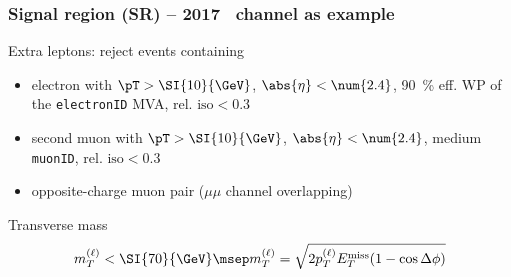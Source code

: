 \begin{frame}
\frametitle{Signal region (SR) -- 2017 \mu\tauh\ channel as example}

\begin{block}{Extra leptons: reject events containing}
\begin{itemize}
\item electron with $\pT > \SI{10}{\GeV}$, $\abs{\eta} < \num{2.4}$, \SI{90}{\%} eff. WP of the \texttt{electronID} MVA, $\text{rel. iso}<\num{0.3}$
\item second muon with $\pT > \SI{10}{\GeV}$, $\abs{\eta} < \num{2.4}$, medium \texttt{muonID}, $\text{rel. iso}<\num{0.3}$
\item opposite-charge muon pair ($\mu\mu$ channel overlapping)
\end{itemize}
\end{block}

\pause
\begin{block}{Transverse mass}
\begin{equation*}
m_T^{(\ell)}<\SI{70}{\GeV}
\msep
m_T^{(\ell)} = \sqrt{2p_T^{(\ell)} E_T^\text{miss}(1-\cos\Delta\phi)}
\end{equation*}
\end{block}
\end{frame}
